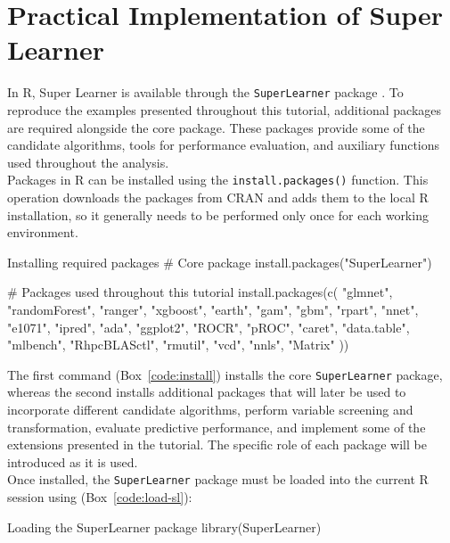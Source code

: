 \documentclass[12pt]{article}
\begin{document}
\section{Practical Implementation of Super Learner}
In R, Super Learner is available through the \texttt{SuperLearner} package \cite{vanDerLaan2007}. 
To reproduce the examples presented throughout this tutorial, additional packages 
are required alongside the core package. These packages provide some of the 
candidate algorithms, tools for performance evaluation, and auxiliary functions 
used throughout the analysis.\\
Packages in R can be installed using the \texttt{install.packages()} function. 
This operation downloads the packages from CRAN and adds them to the local R 
installation, so it generally needs to be performed only once for each working 
environment.

\begin{rcode}[label={code:install}]{Installing required packages}
# Core package
install.packages("SuperLearner")

# Packages used throughout this tutorial
install.packages(c(
  "glmnet", "randomForest", "ranger", "xgboost", "earth", "gam",
  "gbm", "rpart", "nnet", "e1071", "ipred", "ada",
  "ggplot2", "ROCR", "pROC", "caret", "data.table", "mlbench",
  "RhpcBLASctl", "rmutil", "vcd", "nnls", "Matrix"
))
\end{rcode}

The first command (Box~\ref{code:install}) installs the core \texttt{SuperLearner} package, whereas the second installs additional packages \cite{Friedman2010, Liaw2002, Wright2017, Chen2016, Hastie1990, Hastie2017, Ridgeway1999, Therneau1997, Ripley1996} that will later be used to incorporate 
different candidate algorithms, perform variable screening and transformation, 
evaluate predictive performance, and implement some of the extensions presented 
in the tutorial. The specific role of each package will be introduced as it is 
used. \\
Once installed, the \texttt{SuperLearner} package must be loaded into the current 
R session using (Box~\ref{code:load-sl}):

\begin{rcode}[label={code:load-sl}]{Loading the SuperLearner package}
library(SuperLearner)
\end{rcode}
\end{document}
